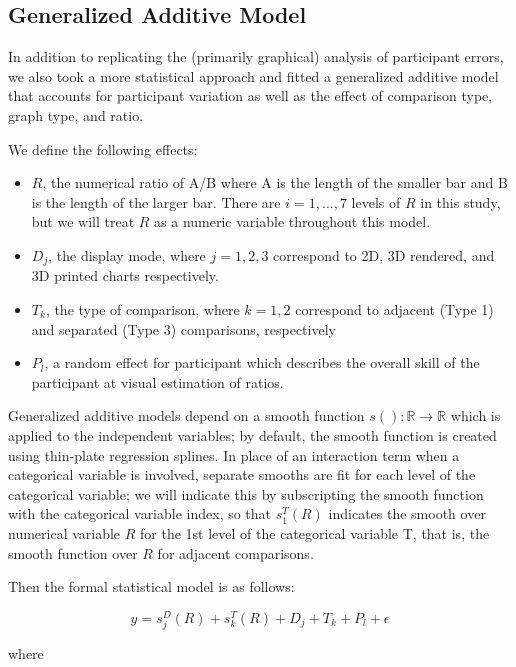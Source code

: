 \documentclass[letterpaper,inpress,dvipsnames]{jdsart}
\begin{document}
\hypertarget{generalized-additive-model}{%
\subsection{Generalized Additive Model}\label{generalized-additive-model}}

In addition to replicating the (primarily graphical) analysis of participant errors, we also took a more statistical approach and fitted a generalized additive model \citep{hastie2017generalized} that accounts for participant variation as well as the effect of comparison type, graph type, and ratio.

We define the following effects:

\begin{itemize}
\item
  \(R\), the numerical ratio of A/B where A is the length of the smaller bar and B is the length of the larger bar. There are \(i=1, ..., 7\) levels of \(R\) in this study, but we will treat \(R\) as a numeric variable throughout this model.
\item
  \(D_j\), the display mode, where \(j = 1, 2, 3\) correspond to 2D, 3D rendered, and 3D printed charts respectively.
\item
  \(T_k\), the type of comparison, where \(k = 1, 2\) correspond to adjacent (Type 1) and separated (Type 3) comparisons, respectively
\item
  \(P_l\), a random effect for participant which describes the overall skill of the participant at visual estimation of ratios.
\end{itemize}

Generalized additive models depend on a smooth function \(s(): \mathbb{R}\rightarrow\mathbb{R}\) which is applied to the independent variables; by default, the smooth function is created using thin-plate regression splines. In place of an interaction term when a categorical variable is involved, separate smooths are fit for each level of the categorical variable; we will indicate this by subscripting the smooth function with the categorical variable index, so that \(s^T_1(R)\) indicates the smooth over numerical variable \(R\) for the 1st level of the categorical variable T, that is, the smooth function over \(R\) for adjacent comparisons.

Then the formal statistical model is as follows:

\[y= s^D_j(R) + s^T_k(R) + D_j + T_k + P_l + \epsilon\]

\noindent where
\end{document}
